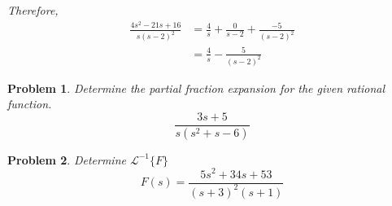 \documentclass{article}
\newtheorem{problem}{Problem}
\begin{document}
    \textit{Therefore,} \\
    \begin{align*}
        \frac{4s^{2} -21s + 16}{s(s - 2)^{2}} &= \frac{4}{s} + \frac{0}{s - 2} + \frac{-5}{(s - 2)^{2}} \\
        &= \frac{4}{s} - \frac{5}{(s - 2)^{2}}
    \end{align*}

    \newpage
    \begin{problem}
        Determine the partial fraction expansion for the given rational function. 
        \[
            \frac{3s + 5}{s(s^{2} + s - 6)}
        \]
    \end{problem}

    \newpage

    \begin{problem}
        Determine $\mathcal{L}^{-1}\{F\}$ 
        \[
            F(s) = \frac{5s^{2} + 34s + 53}{(s + 3)^{2}(s + 1)}
        \]
    \end{problem}
\end{document}

